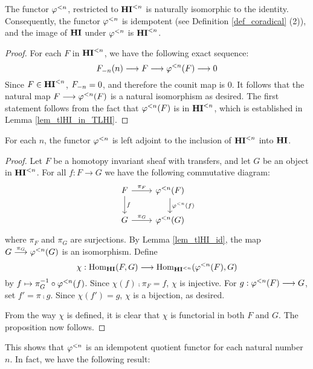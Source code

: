 \begin{lem}\label{lem_tlHI_id}
  The functor $\tlHI{n}$, restricted to $\TFHI{n}$ is naturally
  isomorphic to the identity. Consequently, the functor $\tlHI{n}$ is
  idempotent (see Definition \ref{def_coradical} (2)), and the image
  of $\HI$ under $\tlHI{n}$ is $\TFHI{n}$.
\end{lem}
\begin{proof}
For each $F$ in $\TFHI{n}$, we have the following exact sequence:
\[
\LHI[n]{\RHI[n]{F}} \to F \to \tlHI{n}(F) \to 0
\]
Since $F \in \TFHI{n}$, $\RHI[n]{F} = 0$, and therefore the counit map
is $0$. It follows that the natural map $F \to \tlHI{n}(F)$ is a
natural isomorphism as desired. The first statement follows from the
fact that $\tlHI{n}(F)$ is in $\TLHI{n}{\HI}$, which is established in
Lemma \ref{lem_tlHI_in_TLHI}.
\end{proof}

\begin{prop}\label{prop_HI_lower_slice}
For each $n$, the functor $\tlHI{n}$ is left adjoint to the 
inclusion of $\TLHI{n}{\HI}$ into $\HI$.
\end{prop}
\begin{proof}
Let $F$ be a homotopy invariant sheaf with transfers, and let $G$ 
be an object in $\TLHI{n}{\HI}$. For all $f: F \to G$ we have the 
following commutative diagram:
\[
\begin{tikzcd}
F \arrow{r}{\pi_F} \arrow{d}{f}
& \tlHI{n}(F) \arrow{d}{\tlHI{n}(f)} \\
G \arrow{r}{\pi_G}
& \tlHI{n}(G) 
\end{tikzcd}
\]
where $\pi_F$ and $\pi_G$ are surjections. By Lemma \ref{lem_tlHI_id},
the map $G \stackrel{\pi_G}{\to} \tlHI{n}(G)$ is an
isomorphism. Define
\[
\chi : \homHI(F, G) \to \hom_{\TLHI{n}{\HI}}(\tlHI{n}(F), G)
\]
by $f \mapsto \pi_G^{-1} \circ \tlHI{n}(f)$. Since $\chi(f) \comp 
\pi_F = f$, $\chi$ is injective. For $g: \tlHI{n}(F) \to G$, set 
$f' = \pi \comp g$. Since $\chi(f') = g$, $\chi$ is a bijection, 
as desired.

From the way $\chi$ is defined, it is clear that $\chi$ is 
functorial in both $F$ and $G$. The proposition now follows.
\end{proof}

This shows that $\tlHI{n}$ is an idempotent quotient functor
for each natural number $n$. In fact, we have the following 
result:

